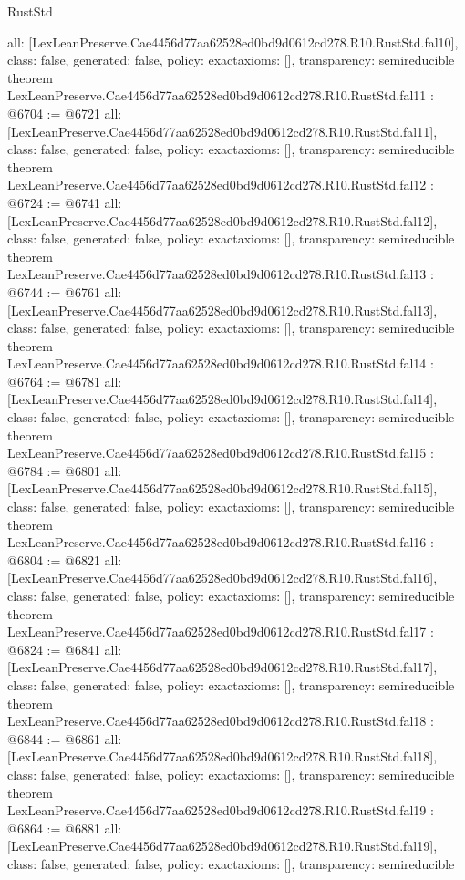 \begin{lexlean}{RustStd}
\begin{coremodule}
{  all: [LexLeanPreserve.Cae4456d77aa62528ed0bd9d0612cd278.R10.RustStd.fal10],
  class: false,
  generated: false,
  policy: exact{axioms: []},
  transparency: semireducible
}
theorem LexLeanPreserve.Cae4456d77aa62528ed0bd9d0612cd278.R10.RustStd.fal11 : @6704 := @6721 {
  all: [LexLeanPreserve.Cae4456d77aa62528ed0bd9d0612cd278.R10.RustStd.fal11],
  class: false,
  generated: false,
  policy: exact{axioms: []},
  transparency: semireducible
}
theorem LexLeanPreserve.Cae4456d77aa62528ed0bd9d0612cd278.R10.RustStd.fal12 : @6724 := @6741 {
  all: [LexLeanPreserve.Cae4456d77aa62528ed0bd9d0612cd278.R10.RustStd.fal12],
  class: false,
  generated: false,
  policy: exact{axioms: []},
  transparency: semireducible
}
theorem LexLeanPreserve.Cae4456d77aa62528ed0bd9d0612cd278.R10.RustStd.fal13 : @6744 := @6761 {
  all: [LexLeanPreserve.Cae4456d77aa62528ed0bd9d0612cd278.R10.RustStd.fal13],
  class: false,
  generated: false,
  policy: exact{axioms: []},
  transparency: semireducible
}
theorem LexLeanPreserve.Cae4456d77aa62528ed0bd9d0612cd278.R10.RustStd.fal14 : @6764 := @6781 {
  all: [LexLeanPreserve.Cae4456d77aa62528ed0bd9d0612cd278.R10.RustStd.fal14],
  class: false,
  generated: false,
  policy: exact{axioms: []},
  transparency: semireducible
}
theorem LexLeanPreserve.Cae4456d77aa62528ed0bd9d0612cd278.R10.RustStd.fal15 : @6784 := @6801 {
  all: [LexLeanPreserve.Cae4456d77aa62528ed0bd9d0612cd278.R10.RustStd.fal15],
  class: false,
  generated: false,
  policy: exact{axioms: []},
  transparency: semireducible
}
theorem LexLeanPreserve.Cae4456d77aa62528ed0bd9d0612cd278.R10.RustStd.fal16 : @6804 := @6821 {
  all: [LexLeanPreserve.Cae4456d77aa62528ed0bd9d0612cd278.R10.RustStd.fal16],
  class: false,
  generated: false,
  policy: exact{axioms: []},
  transparency: semireducible
}
theorem LexLeanPreserve.Cae4456d77aa62528ed0bd9d0612cd278.R10.RustStd.fal17 : @6824 := @6841 {
  all: [LexLeanPreserve.Cae4456d77aa62528ed0bd9d0612cd278.R10.RustStd.fal17],
  class: false,
  generated: false,
  policy: exact{axioms: []},
  transparency: semireducible
}
theorem LexLeanPreserve.Cae4456d77aa62528ed0bd9d0612cd278.R10.RustStd.fal18 : @6844 := @6861 {
  all: [LexLeanPreserve.Cae4456d77aa62528ed0bd9d0612cd278.R10.RustStd.fal18],
  class: false,
  generated: false,
  policy: exact{axioms: []},
  transparency: semireducible
}
theorem LexLeanPreserve.Cae4456d77aa62528ed0bd9d0612cd278.R10.RustStd.fal19 : @6864 := @6881 {
  all: [LexLeanPreserve.Cae4456d77aa62528ed0bd9d0612cd278.R10.RustStd.fal19],
  class: false,
  generated: false,
  policy: exact{axioms: []},
  transparency: semireducible
}
\end{coremodule}
\end{lexlean}
